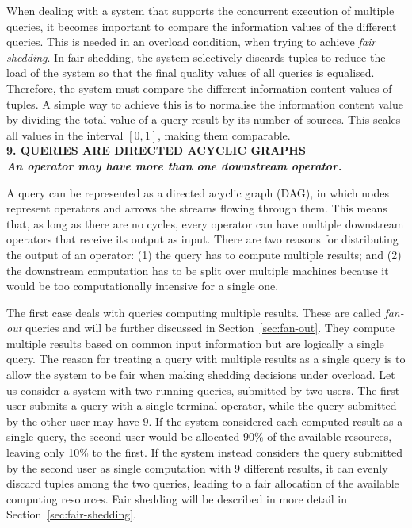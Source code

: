 	When dealing with a system that supports the concurrent execution of multiple queries, it becomes
	important to compare the information values of the different queries. This is needed in
	an overload condition, when trying to achieve \textit{fair shedding}. In fair shedding, the system
	selectively discards tuples to reduce the load of the system so that the final quality values of all
	queries is equalised.
	Therefore, the system must compare the different information content values of tuples. A simple
	way to achieve this is to normalise the information content value by dividing the total
	value of a query result by its number of sources.
	This scales all values in the interval $[0,1]$, making them comparable.\\

\textbf{9. QUERIES ARE DIRECTED ACYCLIC GRAPHS \\ \textit{An operator may have more than one downstream
operator.}}

	A query can be represented as a directed acyclic graph (DAG), in which nodes represent operators and
	arrows the streams flowing through them. This means that, as long as there are no cycles, every operator
	can have multiple downstream operators that receive its output as input. There are two reasons for
	distributing the output of an operator: (1) the query has to compute multiple results; and (2) the
	downstream computation has to be split over multiple machines because it would be too computationally
	intensive for a single one.

The first case deals with queries computing multiple results. These are called \textit{fan-out} queries
and will be further discussed in Section~\ref{sec:fan-out}. They compute multiple results based on common
input information but are logically a single query. The reason for treating a query with multiple results
as a single query is to allow the system to be fair when making shedding decisions under overload.
Let us consider a system with two running queries, submitted by two users. The first user submits a
query with a single terminal operator, while the query submitted by the other user may have $9$.
If the system considered each computed result as a single query, the second user would be allocated 90\%
of the available resources, leaving only 10\% to the first. If the system instead considers the query
submitted by the second user as single computation with $9$ different results, it can evenly discard
tuples among the two queries, leading to a fair allocation of the available computing resources.
Fair shedding will be described in more detail in Section~\ref{sec:fair-shedding}.

